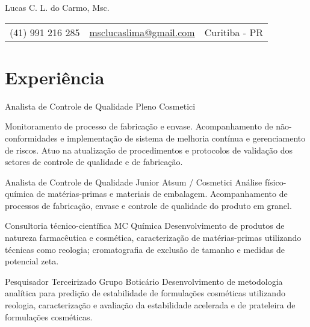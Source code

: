 \pagestyle{fancy} %
\fancyhf{} 
\renewcommand{\headrulewidth}{0pt}


\thispagestyle{empty}

\begin{center}
	
	{\LARGE Lucas C. L. do Carmo, Msc.}
	
	\vspace{6pt}
	\begin{tabular}{c|c|c}
		(41) 991 216 285 & \textcolor{Accent}{\underline{\href{mailto:msclucaslima@gmail.com}{msclucaslima@gmail.com}}} & Curitiba - PR
	\end{tabular}

	\vspace{6pt}
	
\end{center}
	

\section{Experiência}

{Analista de Controle de Qualidade Pleno}
{Cosmetici}
{
	Monitoramento de processo de fabricação e envase.
	Acompanhamento de não-conformidades e implementação de
	sistema de melhoria contínua e gerenciamento de riscos.
	Atuo na atualização de procedimentos e protocolos de validação dos setores
	de controle de qualidade e de fabricação.

}

{Analista de Controle de Qualidade Junior}
{Atsum / Cosmetici}
{
	Análise físico-química de matérias-primas e materiais de embalagem.
	Acompanhamento de processos de fabricação, envase e controle de qualidade do
	produto em granel.
}

{Consultoria técnico-científica}
{MC Química}
{Desenvolvimento de produtos de natureza farmacêutica e cosmética, 
caracterização de matérias-primas utilizando técnicas como reologia;
cromatografia de exclusão de tamanho e medidas de potencial zeta.}

{Pesquisador Terceirizado}
{Grupo Boticário}
{Desenvolvimento de metodologia analítica para predição de estabilidade
de formulações cosméticas utilizando reologia,
caracterização e avaliação da estabilidade acelerada e de prateleira
de formulações cosméticas.}

